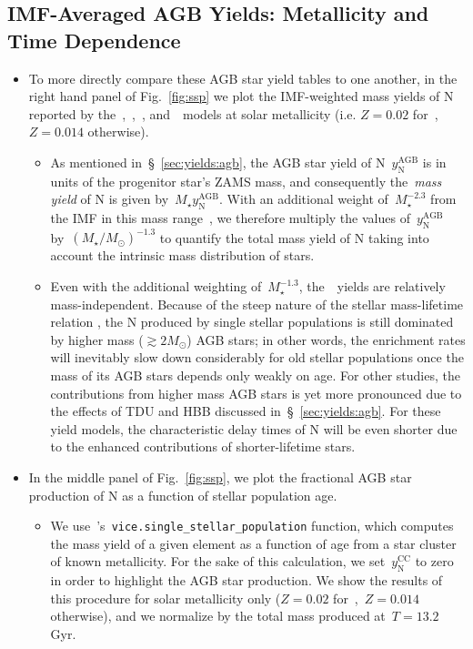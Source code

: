 \documentclass[ms.tex]{subfiles}
\begin{document}
\subsection{IMF-Averaged AGB Yields: Metallicity and Time Dependence} 
\label{sec:yields:imf_agb} 

\begin{itemize} 
	\item To more directly compare these AGB star yield tables to one another, 
	in the right hand panel of Fig.~\ref{fig:ssp} we plot the IMF-weighted mass 
	yields of N reported by the~\cristallo,~\ventura,~\karakasten, 
	and~\karakas~models at solar metallicity (i.e. $Z = 0.02$ for~\karakasten, 
	$Z = 0.014$ otherwise). 
	\begin{itemize} 
		\item As mentioned in~\S~\ref{sec:yields:agb}, the AGB star yield of 
		N~$y_\text{N}^\text{AGB}$ is in units of the progenitor star's ZAMS 
		mass, and consequently the~\textit{mass yield} of N is given 
		by~$M_\star y_\text{N}^\text{AGB}$. 
		With an additional weight of~$M_\star^{-2.3}$ from the IMF in this 
		mass range~\citep{Kroupa20001}, we therefore multiply the values 
		of~$y_\text{N}^\text{AGB}$ by~$(M_\star/M_\odot)^{-1.3}$ to quantify 
		the total mass yield of N taking into account the intrinsic mass 
		distribution of stars. 

		\item Even with the additional weighting of~$M_\star^{-1.3}$, 
		the~\cristallo~yields are relatively mass-independent. 
		Because of the steep nature of the stellar mass-lifetime relation 
		\citep[e.g.][]{Larson1974, Maeder1989, Padovani1993, Hurley2000}, the 
		N produced by single stellar populations is still dominated by higher 
		mass ($\gtrsim 2 M_\odot$) AGB stars; in other words, the enrichment 
		rates will inevitably slow down considerably for old stellar 
		populations once the mass of its AGB stars depends only weakly on age. 
		For other studies, the contributions from higher mass AGB stars is yet 
		more pronounced due to the effects of TDU and HBB discussed 
		in~\S~\ref{sec:yields:agb}. 
		For these yield models, the characteristic delay times of N will be 
		even shorter due to the enhanced contributions of shorter-lifetime 
		stars. 
	\end{itemize} 

	\item In the middle panel of Fig.~\ref{fig:ssp}, we plot the fractional AGB 
	star production of N as a function of stellar population age. 
	\begin{itemize} 
		\item We use~\vice's~\texttt{vice.single\_stellar\_population} 
		function, which computes the mass yield of a given element as a 
		function of age from a star cluster of known metallicity. 
		For the sake of this calculation, we set~$y_\text{N}^\text{CC}$ 
		to zero in order to highlight the AGB star production. 
		We show the results of this procedure for solar metallicity only 
		($Z = 0.02$ for~\karakasten,~$Z = 0.014$ otherwise), and we normalize 
		by the total mass produced at~$T = 13.2$ Gyr. 


\end{itemize}
\end{itemize}
\end{document}

